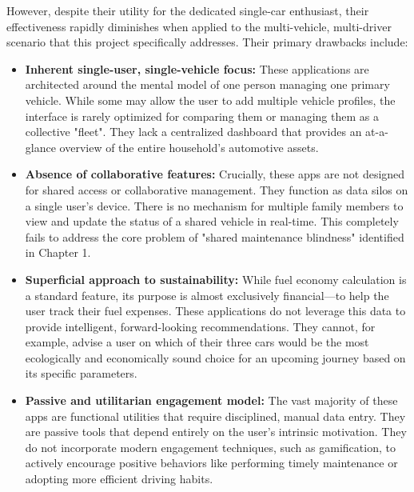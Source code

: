 \textgap

However, despite their utility for the dedicated single-car enthusiast, their effectiveness rapidly diminishes when applied to the multi-vehicle, multi-driver scenario that this project specifically addresses. Their primary drawbacks include:

\begin{itemize}
    \item \textbf{Inherent single-user, single-vehicle focus:} These applications are architected around the mental model of one person managing one primary vehicle. While some may allow the user to add multiple vehicle profiles, the interface is rarely optimized for comparing them or managing them as a collective "fleet". They lack a centralized dashboard that provides an at-a-glance overview of the entire household's automotive assets.
    
    \textgap
    
    \item \textbf{Absence of collaborative features:} Crucially, these apps are not designed for shared access or collaborative management. They function as data silos on a single user's device. There is no mechanism for multiple family members to view and update the status of a shared vehicle in real-time. This completely fails to address the core problem of "shared maintenance blindness" identified in Chapter 1.
    
    \textgap
    
    \item \textbf{Superficial approach to sustainability:} While fuel economy calculation is a standard feature, its purpose is almost exclusively financial—to help the user track their fuel expenses. These applications do not leverage this data to provide intelligent, forward-looking recommendations. They cannot, for example, advise a user on which of their three cars would be the most ecologically and economically sound choice for an upcoming journey based on its specific parameters.
    
    \textgap
    
    \item \textbf{Passive and utilitarian engagement model:} The vast majority of these apps are functional utilities that require disciplined, manual data entry. They are passive tools that depend entirely on the user's intrinsic motivation. They do not incorporate modern engagement techniques, such as gamification, to actively encourage positive behaviors like performing timely maintenance or adopting more efficient driving habits.
\end{itemize}

